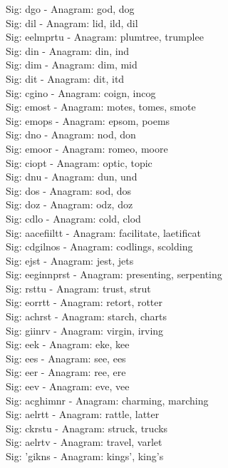 Sig: {dgo} - Anagram: god, dog \\
Sig: {dil} - Anagram: lid, ild, dil \\
Sig: {eelmprtu} - Anagram: plumtree, trumplee \\
Sig: {din} - Anagram: din, ind \\
Sig: {dim} - Anagram: dim, mid \\
Sig: {dit} - Anagram: dit, itd \\
Sig: {cgino} - Anagram: coign, incog \\
Sig: {emost} - Anagram: motes, tomes, smote \\
Sig: {emops} - Anagram: epsom, poems \\
Sig: {dno} - Anagram: nod, don \\
Sig: {emoor} - Anagram: romeo, moore \\
Sig: {ciopt} - Anagram: optic, topic \\
Sig: {dnu} - Anagram: dun, und \\
Sig: {dos} - Anagram: sod, dos \\
Sig: {doz} - Anagram: odz, doz \\
Sig: {cdlo} - Anagram: cold, clod \\
Sig: {aacefiiltt} - Anagram: facilitate, laetificat \\
Sig: {cdgilnos} - Anagram: codlings, scolding \\
Sig: {ejst} - Anagram: jest, jets \\
Sig: {eeginnprst} - Anagram: presenting, serpenting \\
Sig: {rsttu} - Anagram: trust, strut \\
Sig: {eorrtt} - Anagram: retort, rotter \\
Sig: {achrst} - Anagram: starch, charts \\
Sig: {giinrv} - Anagram: virgin, irving \\
Sig: {eek} - Anagram: eke, kee \\
Sig: {ees} - Anagram: see, ees \\
Sig: {eer} - Anagram: ree, ere \\
Sig: {eev} - Anagram: eve, vee \\
Sig: {acghimnr} - Anagram: charming, marching \\
Sig: {aelrtt} - Anagram: rattle, latter \\
Sig: {ckrstu} - Anagram: struck, trucks \\
Sig: {aelrtv} - Anagram: travel, varlet \\
Sig: {'gikns} - Anagram: kings', king's \\

